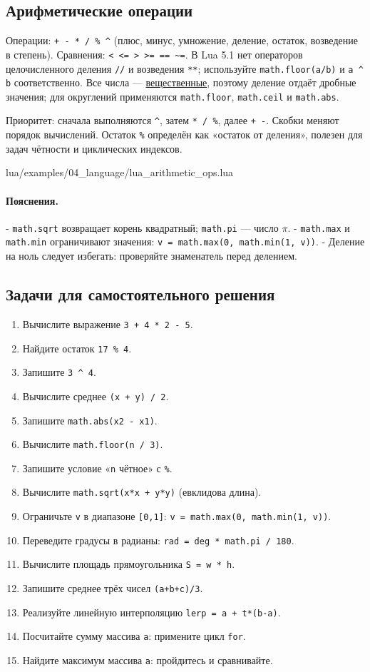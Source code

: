 \subsection{Арифметические операции}
Операции: \verb|+ - * / % ^| (плюс, минус, умножение, деление, остаток, возведение в степень). Сравнения: \verb|< <= > >= == ~=|. В Lua 5.1 нет операторов целочисленного деления \verb|//| и возведения \verb|**|; используйте \verb|math.floor(a/b)| и \verb|a ^ b| соответственно. Все числа — \hyperlink{term:number}{вещественные}, поэтому деление отдаёт дробные значения; для округлений применяются \verb|math.floor|, \verb|math.ceil| и \verb|math.abs|.

Приоритет: сначала выполняются \verb|^|, затем \verb|* / %|, далее \verb|+ -|. Скобки меняют порядок вычислений. Остаток \verb|%| определён как «остаток от деления», полезен для задач чётности и циклических индексов.
\begin{codefile}{lua/examples/04_language/lua_arithmetic_ops.lua}
\end{codefile}
\paragraph{Пояснения.}
- \verb|math.sqrt| возвращает корень квадратный; \verb|math.pi| — число $\pi$.
- \verb|math.max| и \verb|math.min| ограничивают значения: \verb|v = math.max(0, math.min(1, v))|.
- Деление на ноль следует избегать: проверяйте знаменатель перед делением.
\subsection*{Задачи для самостоятельного решения}
\begin{enumerate}
  \item Вычислите выражение \verb|3 + 4 * 2 - 5|.
  \item Найдите остаток \verb|17 % 4|.
  \item Запишите \verb|3 ^ 4|.
  \item Вычислите среднее \verb|(x + y) / 2|.
  \item Запишите \verb|math.abs(x2 - x1)|.
  \item Вычислите \verb|math.floor(n / 3)|.
  \item Запишите условие «\verb|n| чётное» с \verb|%|.
  \item Вычислите \verb|math.sqrt(x*x + y*y)| (евклидова длина).
  \item Ограничьте \verb|v| в диапазоне \verb|[0,1]|: \verb|v = math.max(0, math.min(1, v))|.
  \item Переведите градусы в радианы: \verb|rad = deg * math.pi / 180|.
  \item Вычислите площадь прямоугольника \verb|S = w * h|.
  \item Запишите среднее трёх чисел \verb|(a+b+c)/3|.
  \item Реализуйте линейную интерполяцию \verb|lerp = a + t*(b-a)|.
  \item Посчитайте сумму массива \verb|a|: примените цикл \verb|for|.
  \item Найдите максимум массива \verb|a|: пройдитесь и сравнивайте.
\end{enumerate}
